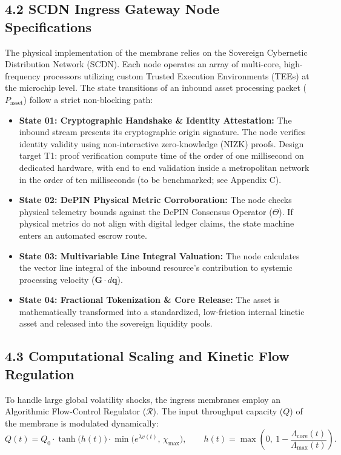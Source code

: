 \documentclass[11pt,a4paper]{article}
\theoremstyle{definition}
\theoremstyle{plain}
\theoremstyle{remark}
\begin{document}
\subsection*{4.2 SCDN Ingress Gateway Node Specifications}
The physical implementation of the membrane relies on the Sovereign Cybernetic Distribution Network (SCDN). Each node operates an array of multi-core, high-frequency processors utilizing custom Trusted Execution Environments (TEEs) at the microchip level. The state transitions of an inbound asset processing packet ($P_{\mathrm{asset}}$) follow a strict non-blocking path:
\begin{itemize}
\item \textbf{State 01: Cryptographic Handshake \& Identity Attestation:} The inbound stream presents its cryptographic origin signature. The node verifies identity validity using non-interactive zero-knowledge (NIZK) proofs. Design target T1: proof verification compute time of the order of one millisecond on dedicated hardware, with end to end validation inside a metropolitan network in the order of ten milliseconds (to be benchmarked; see Appendix C).
\item \textbf{State 02: DePIN Physical Metric Corroboration:} The node checks physical telemetry bounds against the DePIN Consensus Operator ($\Theta$). If physical metrics do not align with digital ledger claims, the state machine enters an automated escrow route.
\item \textbf{State 03: Multivariable Line Integral Valuation:} The node calculates the vector line integral of the inbound resource's contribution to systemic processing velocity ($\mathbf G \cdot d\mathbf q$).
\item \textbf{State 04: Fractional Tokenization \& Core Release:} The asset is mathematically transformed into a standardized, low-friction internal kinetic asset and released into the sovereign liquidity pools.
\end{itemize}

\subsection*{4.3 Computational Scaling and Kinetic Flow Regulation}
To handle large global volatility shocks, the ingress membranes employ an Algorithmic Flow-Control Regulator ($\mathcal R$). The input throughput capacity ($Q$) of the membrane is modulated dynamically:
\begin{equation}
Q(t) = Q_0 \cdot \tanh\!\big( h(t) \big) \cdot \min\!\big( e^{\lambda v(t)},\, \chi_{\max} \big),
\qquad
h(t) = \max\!\left( 0,\ 1 - \frac{\Lambda_{\mathrm{core}}(t)}{\Lambda_{\max}(t)} \right).
\end{equation}
\end{document}
